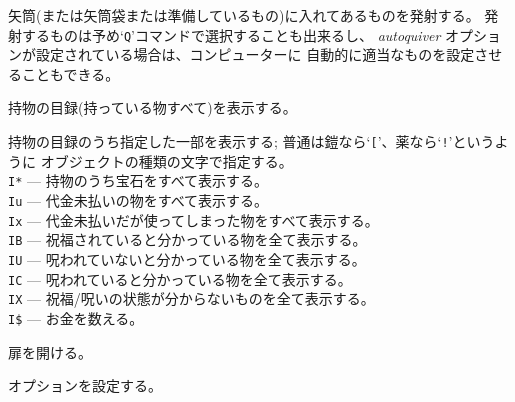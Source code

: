 矢筒(または矢筒袋または準備しているもの)に入れてあるものを発射する。
発射するものは予め`{\tt Q}'コマンドで選択することも出来るし、
{\it autoquiver\/} オプションが設定されている場合は、コンピューターに
自動的に適当なものを設定させることもできる。
\item[\tb{i}]
持物の目録(持っている物すべて)を表示する。
\item[\tb{I}]
持物の目録のうち指定した一部を表示する; 普通は鎧なら`{\tt [}'、薬なら`{\tt !}'というように
オブジェクトの種類の文字で指定する。\\
{\tt I*} --- 持物のうち宝石をすべて表示する。\\
{\tt Iu} --- 代金未払いの物をすべて表示する。\\
{\tt Ix} --- 代金未払いだが使ってしまった物をすべて表示する。\\
{\tt IB} --- 祝福されていると分かっている物を全て表示する。\\
{\tt IU} --- 呪われていないと分かっている物を全て表示する。\\
{\tt IC} --- 呪われていると分かっている物を全て表示する。\\
{\tt IX} --- 祝福/呪いの状態が分からないものを全て表示する。\\
{\tt I\$} --- お金を数える。
\item[\tb{o}]
扉を開ける。
\item[\tb{O}]
オプションを設定する。\\
